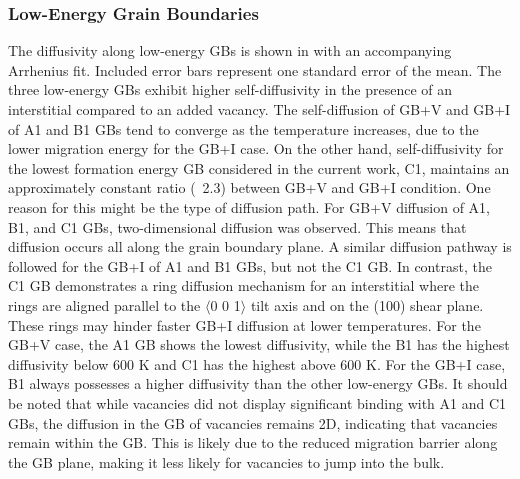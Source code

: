 \documentclass[review]{elsarticle}
\begin{document}
\subsubsection{Low-Energy Grain Boundaries}

\par The diffusivity along low-energy GBs is shown in  with an accompanying Arrhenius fit. Included error bars represent one standard error of the mean. The three low-energy GBs exhibit higher self-diffusivity in the presence of an interstitial compared to an added vacancy. The self-diffusion of GB+V and GB+I of A1 and B1 GBs tend to converge as the temperature increases, due to the lower migration energy for the GB+I case. On the other hand, self-diffusivity for the lowest formation energy GB considered in the current work, C1, maintains an approximately constant ratio (~2.3) between GB+V and GB+I condition. One reason for this might be the type of diffusion path. For GB+V diffusion of A1, B1, and C1 GBs, two-dimensional diffusion was observed. This means that diffusion occurs all along the grain boundary plane. A similar diffusion pathway is followed for the GB+I of A1 and B1 GBs, but not the C1 GB. In contrast, the C1 GB demonstrates a ring diffusion mechanism for an interstitial where the rings are aligned parallel to the $\langle$0 0 1$\rangle$ tilt axis and on the (100) shear plane. These rings may hinder faster GB+I diffusion at lower temperatures. For the GB+V case, the A1 GB shows the lowest diffusivity, while the B1 has the highest diffusivity below 600 K and C1 has the highest above 600 K. For the GB+I case, B1 always possesses a higher diffusivity than the other low-energy GBs. It should be noted that while vacancies did not display significant binding with A1 and C1 GBs, the diffusion in the GB of vacancies remains 2D, indicating that vacancies remain within the GB. This is likely due to the reduced migration barrier along the GB plane, making it less likely for vacancies to jump into the bulk.
\end{document}
